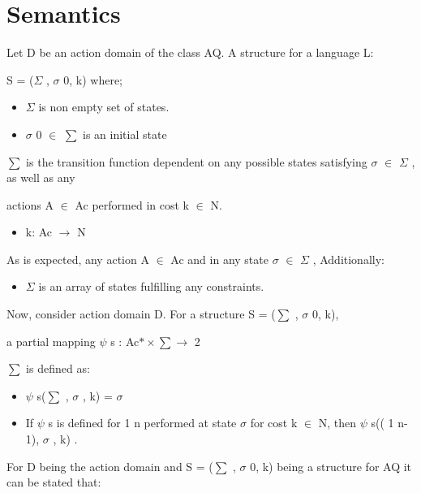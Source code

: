 \documentclass[11pt]{article}
\begin{document}
	\section{Semantics}
	Let D be an action domain of the class AQ. A structure for a language L:\par
	S = ($  \Sigma  $ , $ \sigma $ 0, k) where;\par
	\begin{itemize}
		\item $  \Sigma  $  is non empty set of states.\par
		
		\item $ \sigma $ 0 $ \in $  $ \sum $ is an initial state
	\end{itemize}\par
	$ \sum $  is the transition function dependent on any possible states satisfying $ \sigma $  $ \in $  $  \Sigma  $ , as well as any\par
	actions A $ \in $  Ac performed in cost k $ \in $  N.\par
	\begin{itemize}
		\item k: Ac $ \rightarrow $  N
	\end{itemize}\par
	As is expected, any action A $ \in $  Ac and in any state $ \sigma $  $ \in $  $  \Sigma  $ , Additionally:\par
	\begin{itemize}
		\item $  \Sigma  $  is an array of states fulfilling any constraints.
	\end{itemize}\par
	Now, consider action domain D. For a structure S = ($ \sum $ , $ \sigma $ 0, k),\par
	a partial mapping $ \psi $ s : Ac$\ast \times \sum \rightarrow $  2\par
	$ \sum $  is defined as:\par
	\begin{itemize}
		\item $ \psi $ s($ \sum $ , $ \sigma $ , k) = $ \sigma $ \par
		
		\item If $ \psi $ s is defined for 1 n performed at state $ \sigma $  for cost k $ \in $  N, then $ \psi $ s(( 1 n-1), $ \sigma $ , k) .
	\end{itemize}\par
	For D being the action domain and S = ($ \sum $ , $ \sigma $ 0, k) being a structure for AQ it can be stated that:\par
\end{document}
